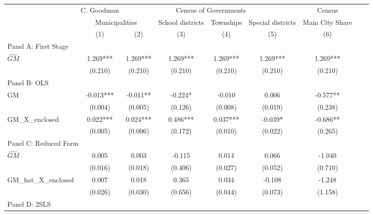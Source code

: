  \begin{tabular}{l*{8}{c}} \toprule
&\multicolumn{1}{c}{C. Goodman}&\multicolumn{4}{c}{Census of Governments}&\multicolumn{1}{c}{Census}\\\cmidrule(lr){2-2}\cmidrule(lr){3-6}\cmidrule(lr){7-7}
&\multicolumn{2}{c}{Municipalities}&\multicolumn{1}{c}{School districts}&\multicolumn{1}{c}{Townships}&\multicolumn{1}{c}{Special districts}&\multicolumn{1}{c}{Main City Share}\\\cmidrule(lr){2-3}\cmidrule(lr){4-6}\cmidrule(lr){7-7}
&\multicolumn{1}{c}{(1)}&\multicolumn{1}{c}{(2)}&\multicolumn{1}{c}{(3)}&\multicolumn{1}{c}{(4)}&\multicolumn{1}{c}{(5)}&\multicolumn{1}{c}{(6)}\\
\cmidrule(lr){1-7}
\multicolumn{6}{l}{Panel A: First Stage}\\
\cmidrule(lr){1-7}
$\widehat{GM}$  &    1.269***&    1.269***&    1.269***&    1.269***&    1.269***&    1.269***\\
                &  (0.210)   &  (0.210)   &  (0.210)   &  (0.210)   &  (0.210)   &  (0.210)   \\
\cmidrule(lr){1-7}
\multicolumn{6}{l}{Panel B: OLS}\\
\cmidrule(lr){1-7}
GM              &   -0.013***&   -0.011** &   -0.224*  &   -0.010   &    0.006   &   -0.577** \\
                &  (0.004)   &  (0.005)   &  (0.126)   &  (0.008)   &  (0.019)   &  (0.238)   \\
\addlinespace
GM\_X\_enclosed   &    0.022***&    0.024***&    0.486***&    0.037***&   -0.039*  &   -0.686** \\
                &  (0.005)   &  (0.006)   &  (0.172)   &  (0.010)   &  (0.022)   &  (0.265)   \\
\cmidrule(lr){1-7}
\multicolumn{6}{l}{Panel C: Reduced Form}\\
\cmidrule(lr){1-7}
$\widehat{GM}$  &    0.005   &    0.003   &   -0.115   &    0.014   &    0.066   &   -1.040   \\
                &  (0.016)   &  (0.018)   &  (0.406)   &  (0.027)   &  (0.052)   &  (0.710)   \\
\addlinespace
GM\_hat\_X\_enclosed&    0.007   &    0.018   &    0.365   &    0.034   &   -0.108   &   -1.248   \\
                &  (0.026)   &  (0.030)   &  (0.656)   &  (0.044)   &  (0.073)   &  (1.158)   \\
\cmidrule(lr){1-7}
\multicolumn{6}{l}{Panel D: 2SLS}\\
\cmidrule(lr){1-7}

\end{tabular}
